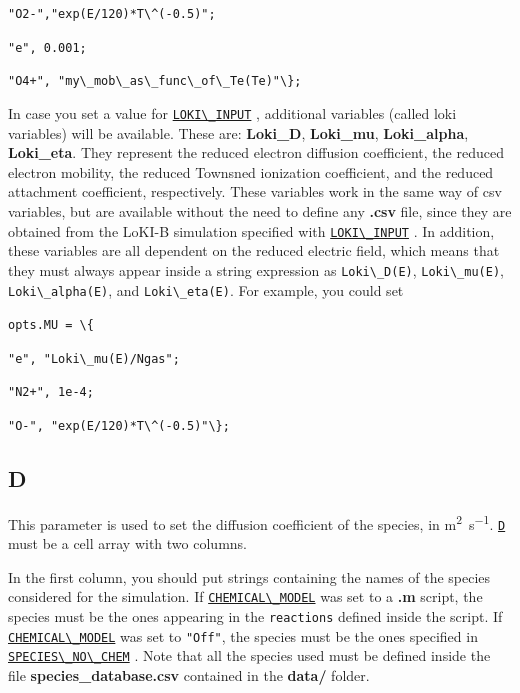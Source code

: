 \documentclass[12pt,a4paper]{article}
\newcommand{\matlabs}[1]{{\lstinline[style=MatlabStyle]!#1!}}
\newcommand{\seclink}[2]{%
	\begingroup
	\hypersetup{linkcolor=orange}%
	\hyperref[sec:#1]{\matlabs{#2}}%
	\endgroup
}
\begin{document}
	\hspace{40pt} \matlabs{"O2-","exp(E/120)*T\^(-0.5)";} 
	
	\hspace{40pt} \matlabs{"e", 0.001;}
	
	\hspace{40pt} \matlabs{"O4+", "my\_mob\_as\_func\_of\_Te(Te)"\};}
	
	\noindent In case you set a value for \seclink{lokiinput}{LOKI\_INPUT}, additional variables (called loki variables) will be available. These are: \textbf{Loki\_D}, \textbf{Loki\_mu}, \textbf{Loki\_alpha}, \textbf{Loki\_eta}. They represent the reduced electron diffusion coefficient, the reduced electron mobility, the reduced Townsned ionization coefficient, and the reduced attachment coefficient, respectively.
	These variables work in the same way of csv variables, but are available without the need to define any \textbf{.csv} file, since they are obtained from the LoKI-B simulation specified with \seclink{lokiinput}{LOKI\_INPUT}. In addition, these variables are all dependent on the reduced electric field, which means that they must always appear inside a string expression as \matlabs{Loki\_D(E)}, \matlabs{Loki\_mu(E)}, \matlabs{Loki\_alpha(E)}, and \matlabs{Loki\_eta(E)}. For example, you could set
	
	\matlabs{opts.MU = \{}
	
	\hspace{40pt} \matlabs{"e", "Loki\_mu(E)/Ngas";} 
	
	\hspace{40pt} \matlabs{"N2+", 1e-4;}
	
	\hspace{40pt} \matlabs{"O-", "exp(E/120)*T\^(-0.5)"\};}
	
	\subsection{D}
	\label{sec:d}
	This parameter is used to set the diffusion coefficient of the species, in \unit{\square\meter\per\second}. \seclink{D}{D} must be a cell array with two columns.
	
	In the first column, you should put strings containing the names of the species considered for the simulation. If \seclink{chemicalmodel}{CHEMICAL\_MODEL} was set to a \textbf{.m} script, the species must be the ones appearing in the \matlabs{reactions} defined inside the script.
	If \seclink{chemicalmodel}{CHEMICAL\_MODEL} was set to \matlabs{"Off"}, the species must be the ones specified in \seclink{speciesnochem}{SPECIES\_NO\_CHEM}. Note that all the species used must be defined inside the file \textbf{species\_database.csv} contained in the \textbf{data/} folder.
	
\end{document}
